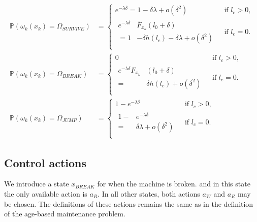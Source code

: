 \[
\begin{split}
\mathbb{P}(\omega_k(x_k)=\Omega_{SURVIVE})&=\begin{cases}
e^{-\lambda \delta}=1-\delta\lambda+o(\delta^2)&\text{ if }l_c>0,\\
\begin{split}
e^{-\lambda \delta} & \bar{F}_{x_k}(l_0+\delta)\\
=1&-\delta h(l_c)-\delta\lambda+o(\delta^2)
\end{split}&\text{ if }l_c=0.\\
\end{cases}\\
\mathbb{P}(\omega_k(x_k)=\Omega_{BREAK})&=\begin{cases}
0&\text{ if }l_c>0,\\
\begin{split}
e^{-\lambda \delta}F_{x_k}&(l_0+\delta)\\
=&\delta h(l_c)+o(\delta^2)
\end{split}&\text{ if }l_c=0.\\
\end{cases}\\
\mathbb{P}(\omega_k(x_k)=\Omega_{JUMP})&=\begin{cases}
1-e^{-\lambda \delta} & \text{ if }l_c>0,\\
\begin{split}
1-&e^{-\lambda \delta}\\
=&\delta\lambda+o(\delta^2)
\end{split}&\text{ if }l_c=0.\\
\end{cases}
\end{split}
\]

\subsection{Control actions}
We introduce a state $x_{BREAK}$ for when the machine is broken.
and in this state the only available action is $a_R$.
In all other states, both actions $a_W$ and $a_R$ may be chosen.
The definitions of these actions remains the same as in the definition of the age-based maintenance problem.

